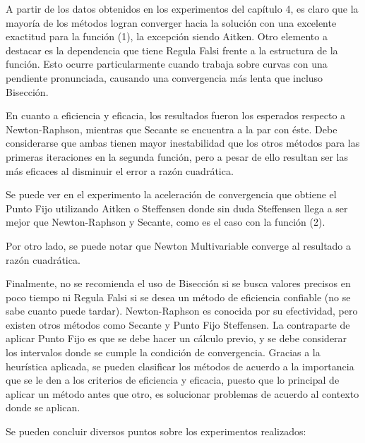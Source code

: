 \documentclass{memoria}
\begin{document}


A partir de los datos obtenidos en los experimentos del capítulo 4, es claro que la mayoría de los métodos logran converger hacia la solución con una excelente exactitud para la función (1), la excepción siendo Aitken. Otro elemento a destacar es la dependencia que tiene Regula Falsi frente a la estructura de la función. Esto ocurre particularmente cuando trabaja sobre curvas con una pendiente pronunciada, causando una convergencia más lenta que incluso Bisección.

En cuanto a eficiencia y eficacia, los resultados fueron los esperados respecto a Newton-Raphson, mientras que Secante se encuentra a la par con éste. Debe considerarse que ambas tienen mayor inestabilidad que los otros métodos para las primeras iteraciones en la segunda función, pero a pesar de ello resultan ser las más eficaces al disminuir el error a razón cuadrática.

Se puede ver en el experimento la aceleración de convergencia que obtiene el Punto Fijo utilizando Aitken o Steffensen donde sin duda Steffensen llega a ser mejor que Newton-Raphson y Secante, como es el caso con la función (2).

Por otro lado, se puede notar que Newton Multivariable converge al resultado a razón cuadrática. 

Finalmente, no se recomienda el uso de Bisección si se busca valores precisos en poco tiempo ni Regula Falsi si se desea un método de eficiencia confiable (no se sabe cuanto puede tardar). Newton-Raphson es conocida por su efectividad, pero existen otros métodos como Secante y Punto Fijo Steffensen. La contraparte de aplicar Punto Fijo es que se debe hacer un cálculo previo, y se debe considerar los intervalos donde se cumple la condición de convergencia. Gracias a la heurística aplicada, se pueden clasificar los métodos de acuerdo a la importancia que se le den a los criterios de eficiencia y eficacia, puesto que lo principal de aplicar un método antes que otro, es solucionar problemas de acuerdo al contexto donde se aplican.\\


Se pueden concluir diversos puntos sobre los experimentos realizados:
\end{document}
